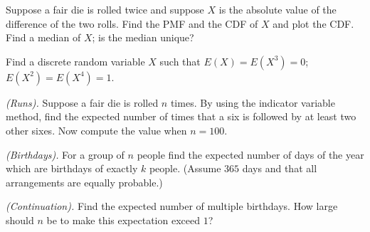 \begin{problem}[Handout 6, \# 5]
  Suppose a fair die is rolled twice and suppose \(X\) is the absolute
  value of the difference of the two rolls. Find the PMF and the CDF of
  \(X\) and plot the CDF. Find a median of \(X\); is the median unique?
\end{problem}
\begin{solution*}
\end{solution*}

\begin{problem}[Handout 6, \# 7]
  Find a discrete random variable \(X\) such that \(E(X)=E(X^3)=0\);
  \(E(X^2)=E(X^4)=1\).
\end{problem}
\begin{solution*}
\end{solution*}

\begin{problem}[Handout 6, \# 9]
  \emph{(Runs).} Suppose a fair die is rolled \(n\) times. By using the
  indicator variable method, find the expected number of times that a six
  is followed by at least two other sixes. Now compute the value when
  \(n=100\).
\end{problem}
\begin{solution*}
\end{solution*}

\begin{problem}[Handout 6, \# 10]
  \emph{(Birthdays).} For a group of \(n\) people find the expected number
  of days of the year which are birthdays of exactly \(k\) people. (Assume
  \(365\) days and that all arrangements are equally probable.)
\end{problem}
\begin{solution*}
\end{solution*}

\begin{problem}[Handout 6, \# 11]
  \emph{(Continuation).} Find the expected number of multiple
  birthdays. How large should \(n\) be to make this expectation exceed
  \(1\)?
\end{problem}
\begin{solution*}
\end{solution*}

